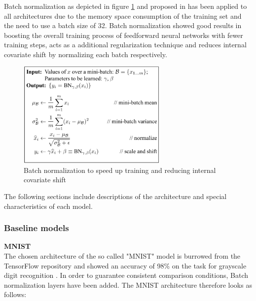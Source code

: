 \documentclass{article}
\theoremstyle{definition}
\theoremstyle{remark}
\begin{document}
Batch normalization as depicted in figure \ref{fig:dropout} and proposed in \cite{ioffe2015batch} has been applied to all architectures due to the memory space consumption of the training set and the need to use a batch size of 32. Batch normalization showed good results in boosting the overall training process of feedforward neural networks with fewer training steps, acts as a additional regularization technique and reduces internal covariate shift by normalizing each batch respectively. 


\begin{figure}[h!]
    \centering
    \includegraphics[width=0.65\textwidth]{img/bn.png}
    \caption{Batch normalization to speed up training and reducing internal covariate shift}
    \label{fig:dropout}
\end{figure}


The following sections include descriptions of the architecture and special characteristics of each model. 



\subsubsection{Baseline models}


\noindent\textbf{MNIST}\\

The chosen architecture of the so called "MNIST" model is burrowed from the TensorFlow repository \cite{mnist_code} and showed an accuracy of 98\% on the task for grayscale digit recognition \cite{deng2012mnist}. In order to guarantee consistent comparison conditions, Batch normalization layers have been added. The MNIST architecture therefore looks as follows:
\end{document}
